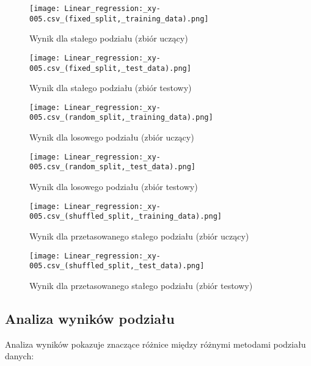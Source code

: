 \documentclass{article}
\begin{document}
\begin{figure}[H]
    \centering
    \begin{minipage}{0.45\textwidth}
        \texttt{[image: Linear\_regression:\_xy-005.csv\_(fixed\_split,\_training\_data).png]}
        \caption{Wynik dla stałego podziału (zbiór uczący)}
    \end{minipage}
    \hfill
    \begin{minipage}{0.45\textwidth}
        \texttt{[image: Linear\_regression:\_xy-005.csv\_(fixed\_split,\_test\_data).png]}
        \caption{Wynik dla stałego podziału (zbiór testowy)}
    \end{minipage}
\end{figure}

\begin{figure}[H]
    \centering
    \begin{minipage}{0.45\textwidth}
        \texttt{[image: Linear\_regression:\_xy-005.csv\_(random\_split,\_training\_data).png]}
        \caption{Wynik dla losowego podziału (zbiór uczący)}
    \end{minipage}
    \hfill
    \begin{minipage}{0.45\textwidth}
        \texttt{[image: Linear\_regression:\_xy-005.csv\_(random\_split,\_test\_data).png]}
        \caption{Wynik dla losowego podziału (zbiór testowy)}
    \end{minipage}
\end{figure}

\begin{figure}[H]
    \centering
    \begin{minipage}{0.45\textwidth}
        \texttt{[image: Linear\_regression:\_xy-005.csv\_(shuffled\_split,\_training\_data).png]}
        \caption{Wynik dla przetasowanego stałego podziału (zbiór uczący)}
    \end{minipage}
    \hfill
    \begin{minipage}{0.45\textwidth}
        \texttt{[image: Linear\_regression:\_xy-005.csv\_(shuffled\_split,\_test\_data).png]}
        \caption{Wynik dla przetasowanego stałego podziału (zbiór testowy)}
    \end{minipage}
\end{figure}

\subsection{Analiza wyników podziału}
Analiza wyników pokazuje znaczące różnice między różnymi metodami podziału danych:
\end{document}
